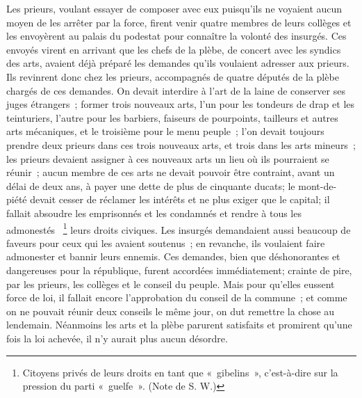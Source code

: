 \documentclass[french,twoside]{book} %
\newenvironment{quoteblock}%
  {\begin{quoting}}
  {\end{quoting}}
\newenvironment{quotebar}{%
    \def\FrameCommand{{\color{rubric!10!}\vrule width 0.5em} \hspace{0.9em}}%
    \def\OuterFrameSep{\itemsep} %
    \MakeFramed {\advance\hsize-\width \FrameRestore}
  }%
  {%
    \endMakeFramed
  }
\renewenvironment{quoteblock}%
  {%
    \savenotes
    \setstretch{0.9}
    \normalfont
    \begin{quotebar}
  }
  {%
    \end{quotebar}
    \spewnotes
  }
\begin{document}
\begin{quoteblock}
 Les prieurs, voulant essayer de composer avec eux puisqu'ils ne voyaient aucun moyen de les arrêter par la force, firent venir quatre membres de leurs collèges et les envoyèrent au palais du podestat pour connaître la volonté des insurgés. Ces envoyés virent en arrivant que les chefs de la plèbe, de concert avec les syndics des arts, avaient déjà préparé les demandes qu'ils voulaient adresser aux prieurs. Ils revinrent donc chez les prieurs, accompagnés de quatre députés de la plèbe chargés de ces demandes. On devait interdire à l'art de la laine de conserver ses juges étrangers ; former trois nouveaux arts, l'un pour les tondeurs de drap et les teinturiers, l'autre pour les barbiers, faiseurs de pourpoints, tailleurs et autres arts mécaniques, et le troisième pour le menu peuple ; l'on devait toujours prendre deux prieurs dans ces trois nouveaux arts, et trois dans les arts mineurs ; les prieurs devaient assigner à ces nouveaux arts un lieu où ils pourraient se réunir ; aucun membre de ces arts ne devait pouvoir être contraint, avant un délai de deux ans, à payer une dette de plus de cinquante ducats; le mont-de-piété devait cesser de réclamer les intérêts et ne plus exiger que le capital; il fallait absoudre les emprisonnés et les condamnés et rendre à tous les admonestés  \footnote{Citoyens privés de leurs droits en tant que « gibelins », c'est-à-dire sur la pression du parti « guelfe ». (Note de S. W.)} leurs droits civiques. Les insurgés deman­daient aussi beaucoup de faveurs pour ceux qui les avaient soutenus ; en revanche, ils voulaient faire admonester et bannir leurs ennemis. Ces deman­des, bien que déshonorantes et dangereuses pour la république, furent accor­dées immédiatement; crainte de pire, par les prieurs, les collèges et le conseil du peuple. Mais pour qu'elles eussent force de loi, il fallait encore l'approba­tion du conseil de la commune ; et comme on ne pouvait réunir deux conseils le même jour, on dut remettre la chose au lendemain. Néanmoins les arts et la plèbe parurent satisfaits et promirent qu'une fois la loi achevée, il n'y aurait plus aucun désordre. \par

\end{quoteblock}
\end{document}

